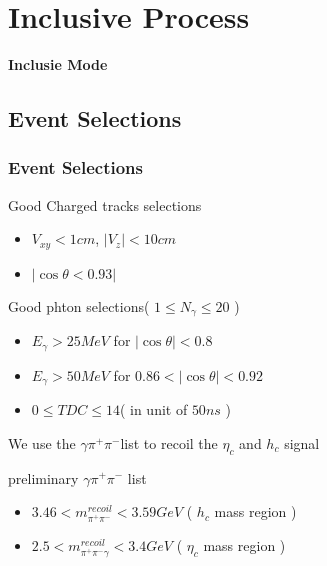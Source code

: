 \documentclass{beamer}
\begin{document}
\section{Inclusive Process}
\begin{frame}
    \begin{center}
        \Huge{\bf Inclusie Mode}
    \end{center}
\end{frame}
\subsection{Event Selections}
\begin{frame}
    \frametitle{Event Selections}
    \begin{block}{Good Charged tracks selections}
        \begin{itemize}
            \item $V_{xy} < 1 cm$, $ | V_z | < 10 cm$
            \item $|\cos\theta < 0.93 |$
        \end{itemize}
    \end{block}
    \begin{block}{Good phton selections( $1\leq N_{\gamma}\leq 20$ )}
        \begin{itemize}
            \item $E_{\gamma} > 25 MeV$ for $|\cos\theta| < 0.8$
            \item $E_{\gamma} > 50 MeV$ for $0.86<|\cos\theta|<0.92$
            \item $0\leq TDC\leq 14 $( in unit of $50ns$ )
        \end{itemize}
    \end{block}
    We use the $\gamma\pi^+\pi^-$list to recoil the $\eta_c$ and $h_c$ signal
    \begin{block}{preliminary $\gamma\pi^+\pi^-$ list}
        \begin{itemize}
            \item $3.46<m_{\pi^+\pi^-}^{recoil}<3.59 GeV$ ( $h_c$ mass region )
            \item $2.5<m_{\pi^+\pi^-\gamma}^{recoil}<3.4 GeV$ ( $\eta_c$ mass region )
        \end{itemize}
    \end{block}
\end{frame}
\end{document}
